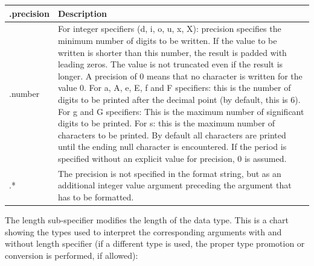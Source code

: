 \documentclass[10pt]{article}
\begin{document}
\begin{center}
    \begin{tabularx}{\linewidth}{|*{2}{>{\RaggedRight\arraybackslash}X|}}
        \hline
        \textbf{.precision} & \textbf{Description} \\
        \hline
        .number & For integer specifiers (d, i, o, u, x, X): precision specifies
                    the minimum number of digits to be written. If the value to
                    be written is shorter than this number, the result is padded
                    with leading zeros. The value is not truncated even if the
                    result is longer. A precision of 0 means that no character
                    is written for the value 0. For a, A, e, E, f and F
                    specifiers: this is the number of digits to be printed after
                    the decimal point (by default, this is 6). For g and G
                    specifiers: This is the maximum number of significant digits
                    to be printed. For s: this is the maximum number of
                    characters to be printed. By default all characters are
                    printed until the ending null character is encountered. If
                    the period is specified without an explicit value for
                    precision, 0 is assumed. \\
        \hline
        .* & The precision is not specified in the format string, but as an
                additional integer value argument preceding the argument that
                has to be formatted. \\
        \hline
    \end{tabularx}
\end{center}

The length sub-specifier modifies the length of the data type. This is a chart
showing the types used to interpret the corresponding arguments with and without
length specifier (if a different type is used, the proper type promotion or
conversion is performed, if allowed):
\end{document}
